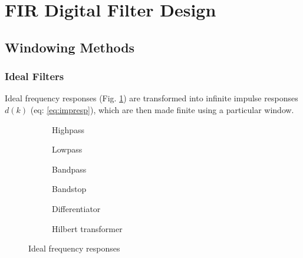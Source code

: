 \section{FIR Digital Filter Design}

\subsection{Windowing Methods}
\subsubsection{Ideal Filters}
Ideal frequency responses (Fig. \ref{fig:freqresp}) are transformed into infinite impulse responses $d(k)$ (eq: \ref{eq:impresp}), which are then made finite using a particular window.

\begin{figure}[htp]
\begin{subfigure}{0.49\textwidth}
\centering
\newcommand{\coordinates}{coordinates {
(-3.14,1) (-1.569,1) (-1.571,0)
( 1.571,0) (1.569,1) ( 3.14,1)
};}

\caption{Highpass}
\end{subfigure}
\begin{subfigure}{0.49\textwidth}
\centering
\newcommand{\coordinates}{coordinates {(-3.14,0) (-1.569,0) (-1.571,1) (1.571,1) (1.569,0) (3.14,0)};}

\caption{Lowpass}
\end{subfigure}

\begin{subfigure}{0.49\textwidth}
\centering
\newcommand{\coordinates}{coordinates {
(-3.14,1) (-2.001,1) (-1.999,0) (-1.001,0) (-0.999,1)
(0.999,1) ( 1.001,0) ( 1.999,0) ( 2.001,1) ( 3.14,1)};}

\caption{Bandpass}
\end{subfigure}
\begin{subfigure}{0.49\textwidth}
\centering
\newcommand{\coordinates}{coordinates {
(-3.14,0) (-2.001,0) (-1.999,1) (-1.001,1) (-0.999,0)
(0.999,0) (1.001,1) (1.999,1) (2.001,0) ( 3.14,0)};}

\caption{Bandstop}
\end{subfigure}

\begin{subfigure}{0.49\textwidth}
\centering
\newcommand{\coordinates}{coordinates {(-3.14,-1) (3.14,1)};}

\caption{Differentiator}
\end{subfigure}
\begin{subfigure}{0.49\textwidth}
\centering
\newcommand{\coordinates}{coordinates {(-3.14,1) (-0.001,1) (0.001,-1) (3.14,-1) };}

\caption{Hilbert transformer}
\end{subfigure}

\caption{Ideal frequency responses}
\label{fig:freqresp}
\end{figure}


